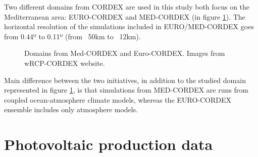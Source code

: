 Two different domains from CORDEX are used in this study both focus on the Mediterranean area: EURO-CORDEX and MED-CORDEX (in figure \ref{fig:cordexdomain}). The horizontal resolution of the simulations included in EURO/MED-CORDEX goes from 0.44º to 0.11º (from ~50km to ~12km).

\begin{figure}[!tbp]
  \centering
  \hfill
  \caption{Domains from Med-CORDEX and Euro-CORDEX. Images from wRCP-CORDEX website.}
    \label{fig:cordexdomain}
\end{figure}

Main difference between the two initiatives, in addition to the studied domain represented in figure \ref{fig:cordexdomain}, is that simulations from MED-CORDEX \cite*{Ruti2016} are runs from coupled ocean-atmosphere climate models, whereas the EURO-CORDEX \cite*{Jacob2010} ensemble includes only atmosphere models. %


\section{Photovoltaic production data}

